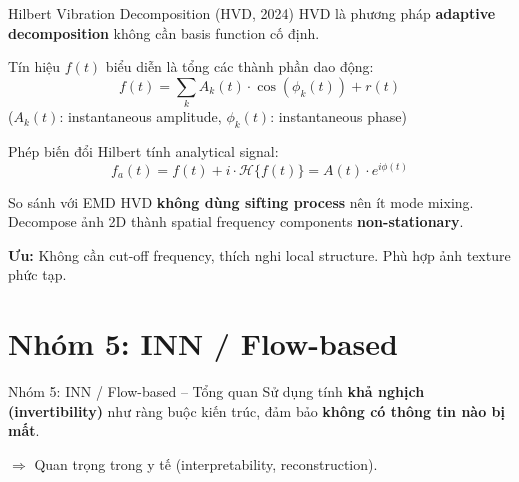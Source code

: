 \documentclass{beamer}
\begin{document}
\begin{frame}{Hilbert Vibration Decomposition (HVD, 2024)}
    \small
    HVD là phương pháp \textbf{adaptive decomposition} không cần basis function cố định.

    \vspace{0.1cm}
    Tín hiệu $f(t)$ biểu diễn là tổng các thành phần dao động:
    \vspace{-0.1cm}
    \begin{equation}
        f(t) = \sum_k A_k(t) \cdot \cos(\phi_k(t)) + r(t)
    \end{equation}
    \vspace{-0.2cm}
    \footnotesize ($A_k(t)$: instantaneous amplitude, $\phi_k(t)$: instantaneous phase)

    \small
    \vspace{0.1cm}
    Phép biến đổi Hilbert tính analytical signal:
    \vspace{-0.1cm}
    \begin{equation}
        f_a(t) = f(t) + i \cdot \mathcal{H}\{f(t)\} = A(t) \cdot e^{i\phi(t)}
    \end{equation}

    \vspace{-0.1cm}
    \begin{block}{\footnotesize So sánh với EMD}
        \footnotesize HVD \textbf{không dùng sifting process} nên ít mode mixing. Decompose ảnh 2D thành spatial frequency components \textbf{non-stationary}.
    \end{block}
    \vspace{0.05cm}
    \footnotesize \textbf{Ưu:} Không cần cut-off frequency, thích nghi local structure. Phù hợp ảnh texture phức tạp.
\end{frame}

\section{Nhóm 5: INN / Flow-based}

\begin{frame}{Nhóm 5: INN / Flow-based -- Tổng quan}
    Sử dụng tính \textbf{khả nghịch (invertibility)} như ràng buộc kiến trúc, đảm bảo \textbf{không có thông tin nào bị mất}.

    \vspace{0.2cm}
    $\Rightarrow$ Quan trọng trong y tế (interpretability, reconstruction).
\end{frame}
\end{document}
